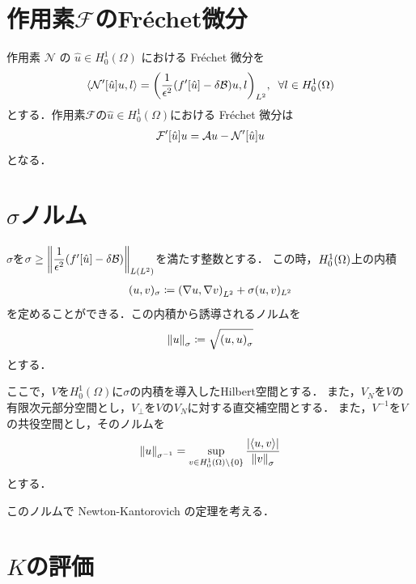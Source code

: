 \section{作用素\(\mathcal{F}\)のFr\'{e}chet微分}
作用素 \(\mathcal{N}\) の \(\hat{u} \in H^1_0(\Omega)\) における Fr\'{e}chet 微分を
\begin{align}
    \langle \mathcal{N}'\qty[\hat{u}]u,l \rangle
    =
    \qty(\frac{1}{\epsilon^2}\qty(f^\prime\qty[\hat{u}]-\delta \mathcal{B})u,l)_{L^2},\;\;\forall l\in H^1_0\qty(\Omega)
\end{align}
とする．作用素\(\mathcal{F}\)の\(\hat{u} \in H^1_0(\Omega)\)における Fr\'{e}chet 微分は
\begin{align}
    \mathcal{F}'\qty[\hat{u}]u = \mathcal{A}u - \mathcal{N}'\qty[\hat{u}]u
\end{align}
となる．


\section{\(\sigma\)ノルム}
\(\sigma\)を\(\sigma \geq \norm{\dfrac{1}{\epsilon^2}(f^\prime[\hat{u}]- \delta\mathcal{B})}_{L(L^2)}\)を満たす整数とする．
この時，\(H^1_0\qty(\Omega)\)上の内積
\begin{align}
    (u,v)_{\sigma}\coloneqq \qty(\nabla u,\nabla v)_{L^2}+\sigma(u,v)_{L^2}
\end{align}
を定めることができる．この内積から誘導されるノルムを
\begin{align}
    {\norm{ u }}_\sigma \coloneqq \sqrt{{(u,u)}_\sigma}
\end{align}
とする．

 
ここで，\(V\)を\(H^1_0(\Omega)\)に\(\sigma\)の内積を導入したHilbert空間とする．
また，\(V_N\)を\(V\)の有限次元部分空間とし，\(V_\perp\)を\(V\)の\(V_N\)に対する直交補空間とする．
また，\(V^{-1}\)を\(V\)の共役空間とし，そのノルムを
\begin{align}
  \norm{u}_{\sigma^{-1}}
  = 
  \sup\limits_{v \in H^1_0\qty(\Omega) \backslash \{ 0 \} }
  \dfrac{\qty|\langle u,v \rangle|}{\norm{v}_\sigma}
\end{align}
とする．

このノルムで Newton-Kantorovich の定理を考える．


\section{\(K\)の評価}%

